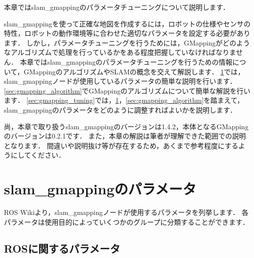 \documentclass[{../../master}]{subfiles}
\begin{document}
本章では\textsf{slam\_gmapping}のパラメータチューニングについて説明します．

\textsf{slam\_gmapping}を使って正確な地図を作成するには，ロボットの仕様やセンサの特性，ロボットの動作環境等に合わせた適切なパラメータを設定する必要があります．
しかし，パラメータチューニングを行うためには，GMappingがどのようなアルゴリズムで処理を行っているかをある程度把握していなければなりません．
本章では\textsf{slam\_gmapping}のパラメータチューニングを行うための情報について，GMappingのアルゴリズムやSLAMの概念を交えて解説します．
\ref{sec:gmapping_parameters}では，\textsf{slam\_gmapping}ノードが使用しているパラメータの簡単な説明を行います．
\ref{sec:gmapping_algorithm}でGMappingのアルゴリズムについて簡単な解説を行います．
\ref{sec:gmapping_tuning}では，\ref{sec:gmapping_parameters}，\ref{sec:gmapping_algorithm}を踏まえて，\textsf{slam\_gmapping}のパラメータをどのように調整すればよいかを説明します．

尚，本章で取り扱う\textsf{slam\_gmapping}のバージョンは1.4.2，本体となるGMappingのバージョンは0.2.1です．
また，本章の解説は筆者が理解できた範囲での説明となります．
間違いや説明抜け等が存在するため，あくまで参考程度にするようにしてください．

\section{\textsf{slam\_gmapping}のパラメータ}
\label{sec:gmapping_parameters}

ROS Wikiより，\textsf{slam\_gmapping}ノードが使用するパラメータを列挙します．
各パラメータは使用目的によっていくつかのグループに分類することができます．

\subsection{ROSに関するパラメータ}
\end{document}
